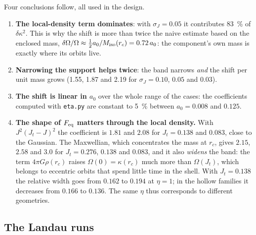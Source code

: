 \documentclass[11pt,a4paper]{article}
\begin{document}
Four conclusions follow, all used in the design.
\begin{enumerate}
\item \textbf{The local-density term dominates}: with $\sigma_J=0.05$ it contributes
\SI{83}{\%} of $\delta\kappa^2$. This is why the shift is more than twice the naive estimate
based on the enclosed mass, $\delta\Omega/\Omega\approx\tfrac12 a_0/M_{\rm iso}(r_c) = 0.72\,a_0$: the component's
own mass is exactly where its orbits live.
\item \textbf{Narrowing the support helps twice}: the band narrows \emph{and} the shift per
unit mass grows (1.55, 1.87 and 2.19 for $\sigma_J=0.10$, $0.05$ and $0.03$).
\item \textbf{The shift is linear in $a_0$} over the whole range of the cases: the
coefficients computed with \texttt{eta.py} are constant to \SI{5}{\%} between $a_0=0.008$ and
$0.125$.
\item \textbf{The shape of $F_{\rm eq}$ matters through the local density.} With $J^2(J_t-J)^2$
the coefficient is $1.81$ and $2.08$ for $J_t=0.138$ and $0.083$, close to the Gaussian. The
Maxwellian, which concentrates the mass at $r_c$, gives $2.15$, $2.58$ and $3.0$ for
$J_t=0.276$, $0.138$ and $0.083$, and it also \emph{widens} the band: the term $4\pi G\rho(r_c)$
raises $\Omega(0)=\kappa(r_c)$ much more than $\Omega(J_t)$, which belongs to eccentric orbits that
spend little time in the shell. With $J_t=0.138$ the relative width goes from $0.162$ to
$0.194$ at $\eta=1$; in the hollow families it decreases from $0.166$ to $0.136$. The same $\eta$
thus corresponds to different geometries.
\end{enumerate}

\subsection{The Landau runs}
\label{sec:landau}
\end{document}
